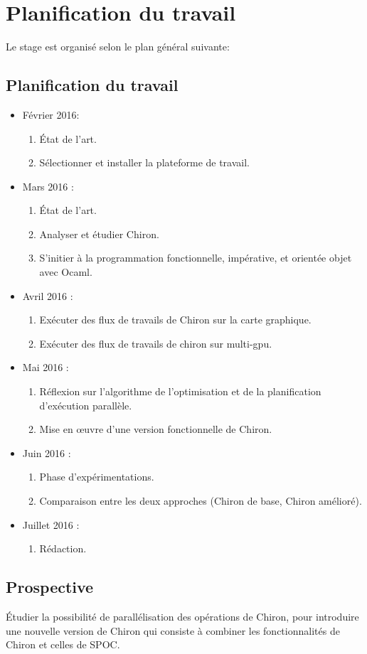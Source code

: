 
\section{ Planification du travail}
Le stage est organisé selon le plan général suivante:
\subsection{Planification du travail}
\begin{itemize}
\item [\textbullet] Février 2016:
	\begin{enumerate}
	\item État de l'art.
	\item Sélectionner et installer la plateforme de travail.
	\end{enumerate}
\item [\textbullet] Mars 2016 :
	\begin{enumerate}
	\item État de l'art.
	\item Analyser et étudier Chiron. 
	\item S'initier à la programmation fonctionnelle, impérative, et orientée objet avec Ocaml.
	\end{enumerate}
\item [\textbullet] Avril 2016 : 
	\begin{enumerate}
	\item Exécuter des flux de travails de Chiron sur la carte graphique.
	\item Exécuter des flux de travails de chiron sur multi-gpu. 
	\end{enumerate}
\item [\textbullet] Mai 2016 :
\begin{enumerate}
	\item Réflexion sur l'algorithme de l'optimisation et de la planification d'exécution parallèle.
	\item Mise en {\oe}uvre d'une version fonctionnelle de Chiron.
	\end{enumerate}
\item [\textbullet] Juin 2016 :
\begin{enumerate}
\item Phase d'expérimentations.
	\item Comparaison entre les deux approches (Chiron de base, Chiron amélioré).
	\end{enumerate}
\item [\textbullet] Juillet 2016 :
\begin{enumerate}
	\item Rédaction. 
	\end{enumerate}	
\end{itemize}

\subsection{Prospective}

Étudier la possibilité de parallélisation des opérations de Chiron, pour introduire une nouvelle version de Chiron qui consiste à combiner les fonctionnalités de Chiron et celles de SPOC.
